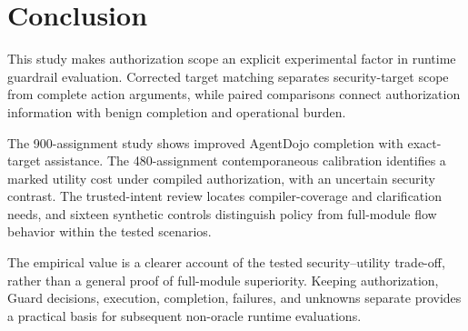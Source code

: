 \section{Conclusion}

\label{sec:conclusion}

This study makes authorization scope an explicit experimental factor in runtime guardrail evaluation. Corrected target matching separates security-target scope from complete action arguments, while paired comparisons connect authorization information with benign completion and operational burden.

The 900-assignment study shows improved AgentDojo completion with exact-target assistance. The 480-assignment contemporaneous calibration identifies a marked utility cost under compiled authorization, with an uncertain security contrast. The trusted-intent review locates compiler-coverage and clarification needs, and sixteen synthetic controls distinguish policy from full-module flow behavior within the tested scenarios.

The empirical value is a clearer account of the tested security--utility trade-off, rather than a general proof of full-module superiority. Keeping authorization, Guard decisions, execution, completion, failures, and unknowns separate provides a practical basis for subsequent non-oracle runtime evaluations.
